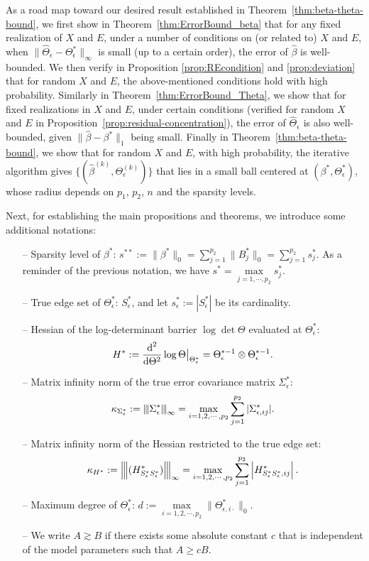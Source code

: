As a road map toward our desired result established in Theorem~\ref{thm:beta-theta-bound}, we first show in Theorem~\ref{thm:ErrorBound_beta} that for any fixed realization of $X$ and $E$, under a number of conditions on (or related to) $X$ and $E$,  when $\|\widehat{\Theta}_\epsilon-\Theta_\epsilon^*\|_\infty$ is small (up to a certain order), the error of $\widehat{\beta}$ is well-bounded. We then verify in Proposition \ref{prop:REcondition} and \ref{prop:deviation} that for random $X$ and $E$, the above-mentioned conditions hold with high probability. Similarly in Theorem~\ref{thm:ErrorBound_Theta}, we show that for fixed realizations in $X$ and $E$, under certain conditions (verified for random $X$ and $E$ in Proposition~\ref{prop:residual-concentration}), the error of $\widehat{\Theta}_\epsilon$ is also well-bounded, given $\|\widehat{\beta}-\beta^*\|_1$ being small. Finally in Theorem~\ref{thm:beta-theta-bound}, we show that for random $X$ and $E$, with high probability, the iterative algorithm gives $\{(\widehat{\beta}^{(k)},\Theta^{(k)}_\epsilon)\}$ that lies in a small ball centered at $(\beta^*,\Theta_\epsilon^*)$, whose radius depends on $p_1$, $p_2$, $n$ and the sparsity levels. %


Next, for establishing the main propositions and theorems, we introduce some additional notations:
\begin{itemize}
\setlength\itemsep{0pt}
\item[--] Sparsity level of $\beta^*$: $s^{**} := \|\beta^*\|_0 = \sum_{j=1}^{p_2}\|B_j^*\|_0 = \sum_{j=1}^{p_2}s_j^*$. As a reminder of the previous notation, we have $s^*=\max\limits_{j=1,\cdots,p_2}s_j^*$.
\item[--] True edge set of $\Theta_\epsilon^*$: $S^*_\epsilon$, and let $s^*_\epsilon:=|S^*_\epsilon|$ be its cardinality.
\item[--] Hessian of the log-determinant barrier $\log\det\Theta$ evaluated at $\Theta_\epsilon^*$: \[H^*:=\frac{\mbox{d}^2}{\mbox{d}\Theta^2}\log\Theta\big{|}_{\Theta^*_\epsilon} = \Theta^{*-1}_\epsilon\otimes \Theta^{*-1}_\epsilon.\]
\item[--] Matrix infinity norm of the true error covariance matrix $\Sigma_\epsilon^*$: \[\kappa_{\Sigma^*_\epsilon}:={\left\vert\kern-0.25ex\left\vert\kern-0.25ex\left\vert \Sigma^*_\epsilon \right\vert\kern-0.25ex\right\vert\kern-0.25ex\right\vert}_\infty =  \max\limits_{i=1,2,\cdots,p_2}\sum_{j=1}^{p_2} |\Sigma_{\epsilon,ij}^*|.\]
\item[--] Matrix infinity norm of the Hessian restricted to the true edge set: 
\[\kappa_{H^*} := {\left\vert\kern-0.25ex\left\vert\kern-0.25ex\left\vert (H^*_{S^*_\epsilon S^*_\epsilon}) \right\vert\kern-0.25ex\right\vert\kern-0.25ex\right\vert}_\infty =\max\limits_{i=1,2,\cdots,p_2}\sum_{j=1}^{p_2} \left|H^*_{S^*_\epsilon S^*_\epsilon,ij}\right|.\] 
\item[--] Maximum degree of $\Theta^*_\epsilon$: $d:= \max\limits_{i=1,2,\cdots,p_2}\|\Theta_{\epsilon,i\cdot}^*\|_0$.
\item[--] We write $A\gtrsim B$ if there exists some absolute constant $c$ that is independent of the model parameters such that $A\geq cB$. 
\end{itemize}

